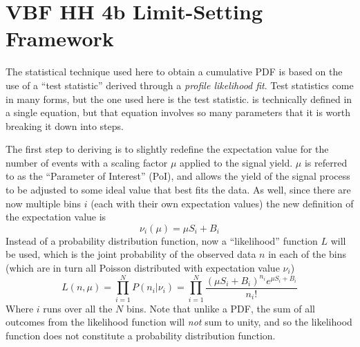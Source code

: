 \FloatBarrier
\section{VBF HH 4b Limit-Setting Framework}
    
    The statistical technique used here to obtain a cumulative PDF
        is based on the use of a ``test statistic'' derived through a \textit{profile likelihood fit}.
    Test statistics come in many forms, but the one used here is the \qtil test statistic.
    \qtil is technically defined in a single equation,
        but that equation involves so many parameters that it is worth breaking it down into steps.


    The first step to deriving \qtil is to slightly redefine the expectation value for the number of events 
        with a scaling factor $\mu$ applied to the signal yield.
    $\mu$ is referred to as the ``Parameter of Interest'' (PoI),
        and allows the yield of the signal process to be adjusted to some ideal value that best fits the data.
    As well, since there are now multiple bins $i$ (each with their own expectation values)
        the new definition of the expectation value is
    \begin{equation}
        \nu_i(\mu) = \mu S_i + B_i
    \end{equation}
    Instead of a probability distribution function, now a ``likelihood'' function $L$ will be used,
        which is the joint probability of the observed data $n$ in each of the bins
        (which are in turn all Poisson distributed with expectation value $\nu_i$)
    \begin{equation}
        L(n,\mu) = \prod \limits_{i=1}^{N} P(n_i | \nu_i)
            = \prod \limits_{i=1}^{N} \frac{ (\mu S_i + B_i)^{n_i} e^{\mu S_i + B_i} }{n_i!}
    \end{equation}
    Where $i$ runs over all the $N$ bins.
    Note that unlike a PDF, the sum of all outcomes from the likelihood function will \textit{not} sum to unity,
        and so the likelihood function does not constitute a probability distribution function\cite{cousins2020likelihood}.

